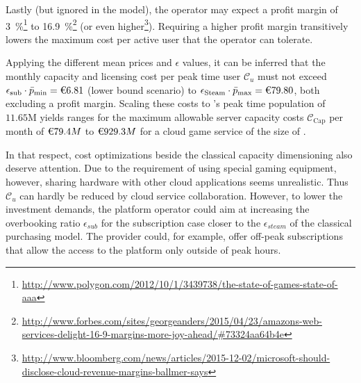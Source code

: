 Lastly (but ignored in the model), the operator may expect a profit margin of \SI{3}{\percent}\footnote{\url{http://www.polygon.com/2012/10/1/3439738/the-state-of-games-state-of-aaa}} to \SI{16.9}{\percent}\footnote{\url{http://www.forbes.com/sites/georgeanders/2015/04/23/amazons-web-services-delight-16-9-margins-more-joy-ahead/\#73324aa64b4e}} (or even higher\footnote{\url{http://www.bloomberg.com/news/articles/2015-12-02/microsoft-should-disclose-cloud-revenue-margins-ballmer-says}}). Requiring a higher profit margin transitively lowers the maximum cost per active user that the operator can tolerate. %

Applying the different mean prices and $\epsilon$ values, it can be inferred that the monthly capacity and licensing cost per peak time user $\mathcal{C}_u$ must not exceed $\epsilon_{\text{sub}} \cdot \bar{p}_{\text{min}} = \text{\texteuro} 6.81$ (lower bound scenario) to $\epsilon_{\text{Steam}} \cdot \bar{p}_{\text{max}} =\text{\texteuro} 79.80$, both excluding a profit margin. Scaling these costs to \steam's peak time population of $11.65\si{\mega}$ yields ranges for the maximum allowable server capacity costs $\mathcal{C}_{\text{Cap}}$ per month of $\text{\texteuro} 79.4M$ to $\text{\texteuro} 929.3M$ for a cloud game service of the size of \steam.


In that respect, cost optimizations beside the classical capacity dimensioning also deserve attention. Due to the requirement of using special gaming equipment, however, sharing hardware with other cloud applications seems unrealistic. Thus $\mathcal{C}_u$ can hardly be reduced by cloud service collaboration. However, to lower the investment demands, the platform operator could aim at increasing the overbooking ratio $\epsilon_{sub}$ for the subscription case closer to the $\epsilon_{steam}$ of the classical purchasing model. The provider could, for example, offer off-peak subscriptions that allow the access to the platform only outside of peak hours.

